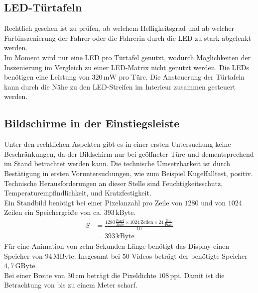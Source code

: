 \subsection{LED-Türtafeln}
Rechtlich gesehen ist zu prüfen, ab welchem Helligkeitsgrad und ab welcher Farbinszenierung der Fahrer oder die Fahrerin durch die LED zu stark abgelenkt werden. \\
Im Moment wird nur eine LED pro Türtafel genutzt, wodurch Möglichkeiten der Inszenierung im Vergleich zu einer LED-Matrix nicht genutzt werden. 
Die LEDs benötigen eine Leistung von $ 320\,\mathrm{mW} $ pro Türe.
Die Ansteuerung der Türtafeln kann durch die Nähe zu den LED-Streifen im Interieur zusammen gesteuert werden.
\subsection{Bildschirme in der Einstiegsleiste}
Unter den rechtlichen Aspekten gibt es in einer ersten Untersuchung keine Beschränkungen, da der Bildschirm nur bei geöffneter Türe und dementsprechend im Stand betrachtet werden kann.
Die technische Umsetzbarkeit ist durch Bestätigung in ersten Voruntersuchungen, wie zum Beispiel Kugelfalltest, positiv. Technische Herausforderungen an dieser Stelle sind Feuchtigkeitsschutz, Temperaturempfindlichkeit, und Kratzfestigkeit. \\
Ein Standbild benötigt bei einer Pixelanzahl pro Zeile von $ 1280 $ und von $ 1024 $ Zeilen ein Speichergröße von ca. $ 393\,\mathrm{kByte}$. 
\begin{align}
	S &= \frac{1280\,\frac{\mathrm{Pixel}}{\mathrm{Zeile}}\times 1024\,\mathrm{Zeilen} \times 24\,\frac{\mathrm{Bit}}{\mathrm{Pixel}}}{10} \\
	&= 393\,\mathrm{kByte}
\end{align}
Für eine Animation von zehn Sekunden Länge benötigt das Display einen Speicher von $ 94\,\mathrm{MByte}$.
Insgesamt bei 50 Videos beträgt der benötigte Speicher $ 4,7\,\mathrm{GByte}$. \\
Bei einer Breite von $ 30\,\mathrm{cm} $ beträgt die Pixeldichte $ 108\,\mathrm{ppi} $. Damit ist die Betrachtung von bis zu einem Meter scharf.
